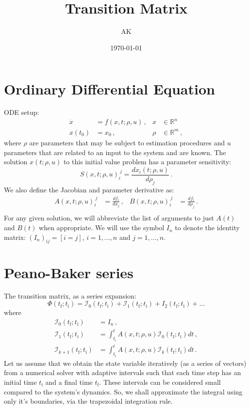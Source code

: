 \documentclass[utf8,english,DIV=12]{scrartcl}
\author{AK}
\date{\today}
\title{Transition Matrix}
\newcommand{\ti}{\ensuremath{t_{\text{i}}}}
\newcommand{\tf}{\ensuremath{t_{\text{f}}}}
\newcommand{\I}{\ensuremath{\mathcal{I}}}
\newcommand{\eye}[1]{\ensuremath{I_{#1}}}
\begin{document}
\maketitle

\section{Ordinary Differential Equation}
\label{sec:ODEs}

ODE setup:
\begin{align}
  \dot x&=f(x,t;\rho,u)\,,&x&\in\mathbb{R}^n\,\label{eq:ODE}\\
  x(t_0)&=x_0\,,&\rho&\in\mathbb{R}^m\,,
\end{align}
where $\rho$ are parameters that may be subject to estimation
procedures and $u$ parameters that are related to an input to the
system and are known. The solution $x(t;\rho,u)$ to this initial value problem has a
parameter sensitivity:
\begin{equation}
  \label{eq:sens}
  S(x,t;\rho,u)_i^{~j}=\frac{dx_i(t;\rho,u)}{d\rho_j}\,.
\end{equation}
We also define the Jacobian and parameter derivative as:
\begin{align}
  \label{eq:AB}
  A(x,t;\rho,u)_i^{~j} &= \frac{df_i}{dx_j}\,,&  B(x,t;\rho,u)_i^{~j} &= \frac{df_i}{d\rho_j}\,.\\
\end{align}
For any given solution, we will abbreviate the list of arguments to
just $A(t)$ and $B(t)$ when appropriate. We will use the symbol $\eye{n}$ to denote the identity matrix: $(\eye{n})_{ij}=[i=j]$, $i=1,\dots,n$ and $j=1,\dots,n$.

\section{Peano-Baker series}

The transition matrix, as a series expansion:
\begin{equation}
  \label{eq:PHI}
  \Phi(\tf;\ti)=\I_0(\tf;\ti) + \I_1(\tf;\ti) + I_2(\tf;\ti) + ...
\end{equation}
where
\begin{equation}
  \label{eq:I}
  \begin{split}
    \I_0(\tf;\ti)&=\eye{n}\,,\\
    \I_1(\tf;\ti)&=\int_{\ti}^{t}A(x,t;\rho,u) \I_0(\tf;\ti) dt\,,\\
    \I_{k+1}(\tf;\ti)&=\int_{\ti}^{t}A(x,t;\rho,u) \I_k(\tf;\ti) dt\,.
  \end{split}
\end{equation}
Let us assume that we obtain the state variable iteratively (as a
series of vectors) from a numerical solver with adaptive intervals
such that each time step has an initial time $\ti$ and a final time
$\tf$. These intervals can be considered small compared to the
system's dynamics. So, we shall approximate the integral using only
it's boundaries, via the trapezoidal integration rule.
\end{document}
